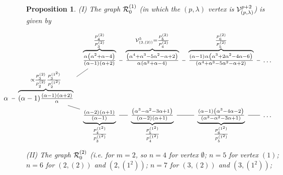 \documentclass{article}
\newcommand{\ppm}[1]{\textcolor{red}{#1}}
\newcommand{\ppmm}[1]{#1}  %
\newcommand{\bajm}[1]{\textcolor{blue}{#1}}
\newtheorem{proposition}[theorem]{Proposition}
\theoremstyle{definition}
\def\l{\lambda}
\numberwithin{equation}{subsection}
\begin{document}

\begin{proposition}\label{pr:l0}
(I) The graph ${\mathcal{R}}^{(1)}_0 $ 
(in which the $(p,\l)$ vertex is $\V^{p+2}_{(p,\l)}$)
is given by      %
\[ \hspace{-1.5cm} 
\begin{tikzcd}[row sep=0em,column sep=0.5em]
&&
\overbrace{
\tfrac{\alpha^{} \left(\alpha^2+\alpha -4\right)^{}}{(\alpha -1)^{} (\alpha +2)^{}} }^{ \frac{P^{(2)}_{4}}{P^{(2)}_{3}} }  \ar[r,dash]
  &
  \overbrace{
  \tfrac{\left(\alpha^4+\alpha^3-5 \alpha^2-\alpha +2\right)^{}}{\alpha^{} \left(\alpha ^2+\alpha -4\right)^{}}}^{ \V^{5}_{(3,(2))} = \frac{P^{(2)}_{5}}{P^{(2)}_{4}}} \ar[r,dash]
  &
  \overbrace{
  \tfrac{(\alpha -1)^{} \alpha^{} \left(\alpha ^3+2 \alpha ^2-4 \alpha -6\right)^{}}{\left(\alpha ^4+\alpha ^3-5 \alpha ^2-\alpha +2\right)^{}} }^{\frac{P^{(2)}_{6}}{P^{(2)}_{5}} \ppm{}}   \ar[r,dash]&
  \dots
\\
\alpha^{}\ar[r,dash] &
  \overbrace{
 (\alpha-1)^{} \tfrac{(\alpha-1)^{} (\alpha+2)^{}}{\alpha^{}}    }^{ \propto \frac{P^{(2)}_{3}}{P^{(2)}_{2}} \frac{P^{(1^2)}_{3}}{P^{(1^2)}_{2}}  }    \ar[ur,dash]\ar[dr,dash]
    \\
    &&
    \underbrace{
    \tfrac{(\alpha -2)^{} (\alpha +1)^{}}{(\alpha -1)^{}}  }_{ \frac{P^{(1^2)}_{4}}{P^{(1^2)}_{3}}  }  \ar[r,dash]
      &
      \underbrace{
    \tfrac{\left(\alpha ^3-\alpha ^2-3 \alpha +1\right)^{}}{(\alpha -2)^{} (\alpha +1)^{}} }_{\frac{P^{(1^2)}_{5}}{P^{(1^2)}_{4}}} \ar[r,dash]
    &
    \underbrace{
    \tfrac{(\alpha -1)^{} \left(\alpha ^3-4 \alpha -2\right)^{}}{\left(\alpha ^3-\alpha ^2-3 \alpha +1\right)^{}} }_{\frac{P^{(1^2)}_{\ppmm{6}}}{P^{(1^2)}_{5}}} \ar[r,dash]&\dots
\end{tikzcd}
\]
%
(II) The graph ${\mathcal{R}}^{(2)}_0 $ \ppmm{(i.e. for $m=2$,  
so $n=4$ for vertex $\emptyset$; 
$n=5$ for vertex $(1)$; 
$n=6$ for $(2,(2))$ and $(2,(1^2))$; 
$n=7$ for $(3,(2))$ and $(3,(1^2))$; 
}
\end{proposition}
\end{document}
